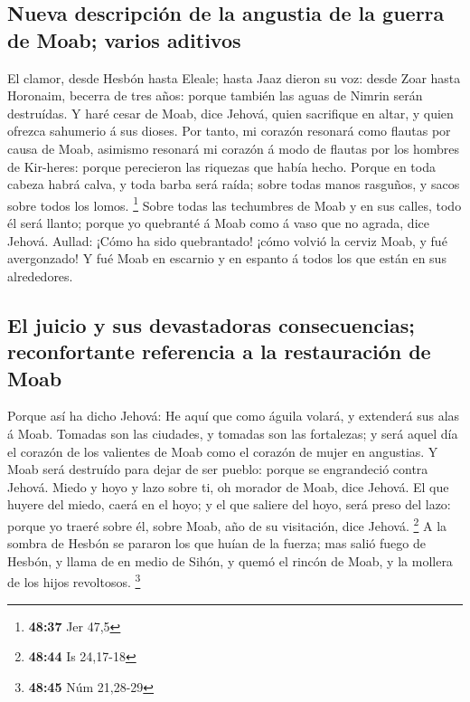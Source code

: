 \hypertarget{nueva-descripciuxf3n-de-la-angustia-de-la-guerra-de-moab-varios-aditivos}{%
\subsection{Nueva descripción de la angustia de la guerra de Moab;
varios
aditivos}\label{nueva-descripciuxf3n-de-la-angustia-de-la-guerra-de-moab-varios-aditivos}}

 El clamor, desde Hesbón hasta Eleale; hasta Jaaz dieron su
voz: desde Zoar hasta Horonaim, becerra de tres años: porque también las
aguas de Nimrin serán destruídas.  Y haré cesar de Moab,
dice Jehová, quien sacrifique en altar, y quien ofrezca sahumerio á sus
dioses.  Por tanto, mi corazón resonará como flautas por
causa de Moab, asimismo resonará mi corazón á modo de flautas por los
hombres de Kir-heres: porque perecieron las riquezas que había hecho.
 Porque en toda cabeza habrá calva, y toda barba será
raída; sobre todas manos rasguños, y sacos sobre todos los lomos.
\footnote{\textbf{48:37} Jer 47,5}  Sobre todas las
techumbres de Moab y en sus calles, todo él será llanto; porque yo
quebranté á Moab como á vaso que no agrada, dice Jehová. 
Aullad: ¡Cómo ha sido quebrantado! ¡cómo volvió la cerviz Moab, y fué
avergonzado! Y fué Moab en escarnio y en espanto á todos los que están
en sus alrededores.

\hypertarget{el-juicio-y-sus-devastadoras-consecuencias-reconfortante-referencia-a-la-restauraciuxf3n-de-moab}{%
\subsection{El juicio y sus devastadoras consecuencias; reconfortante
referencia a la restauración de
Moab}\label{el-juicio-y-sus-devastadoras-consecuencias-reconfortante-referencia-a-la-restauraciuxf3n-de-moab}}

 Porque así ha dicho Jehová: He aquí que como águila
volará, y extenderá sus alas á Moab.  Tomadas son las
ciudades, y tomadas son las fortalezas; y será aquel día el corazón de
los valientes de Moab como el corazón de mujer en angustias.
 Y Moab será destruído para dejar de ser pueblo: porque se
engrandeció contra Jehová.  Miedo y hoyo y lazo sobre ti,
oh morador de Moab, dice Jehová.  El que huyere del miedo,
caerá en el hoyo; y el que saliere del hoyo, será preso del lazo: porque
yo traeré sobre él, sobre Moab, año de su visitación, dice Jehová.
\footnote{\textbf{48:44} Is 24,17-18}  A la sombra de
Hesbón se pararon los que huían de la fuerza; mas salió fuego de Hesbón,
y llama de en medio de Sihón, y quemó el rincón de Moab, y la mollera de
los hijos revoltosos. \footnote{\textbf{48:45} Núm 21,28-29}

